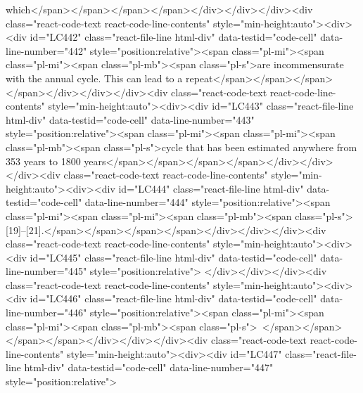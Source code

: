 {{{{{{which</span></span></span></span></div></div></div><div class="react-code-text react-code-line-contents" style="min-height:auto"><div><div id="LC442" class="react-file-line html-div" data-testid="code-cell" data-line-number="442" style="position:relative"><span class="pl-mi"><span class="pl-mi"><span class="pl-mb"><span class="pl-s">are incommensurate with the annual cycle. This can lead to a repeat</span></span></span></span></div></div></div><div class="react-code-text react-code-line-contents" style="min-height:auto"><div><div id="LC443" class="react-file-line html-div" data-testid="code-cell" data-line-number="443" style="position:relative"><span class="pl-mi"><span class="pl-mi"><span class="pl-mb"><span class="pl-s">cycle that has been estimated anywhere from 353 years to 1800 years</span></span></span></span></div></div></div><div class="react-code-text react-code-line-contents" style="min-height:auto"><div><div id="LC444" class="react-file-line html-div" data-testid="code-cell" data-line-number="444" style="position:relative"><span class="pl-mi"><span class="pl-mi"><span class="pl-mb"><span class="pl-s">{[}19{]}--{[}21{]}.</span></span></span></span></div></div></div><div class="react-code-text react-code-line-contents" style="min-height:auto"><div><div id="LC445" class="react-file-line html-div" data-testid="code-cell" data-line-number="445" style="position:relative">
</div></div></div><div class="react-code-text react-code-line-contents" style="min-height:auto"><div><div id="LC446" class="react-file-line html-div" data-testid="code-cell" data-line-number="446" style="position:relative"><span class="pl-mi"><span class="pl-mi"><span class="pl-mb"><span class="pl-s">~</span></span></span></span></div></div></div><div class="react-code-text react-code-line-contents" style="min-height:auto"><div><div id="LC447" class="react-file-line html-div" data-testid="code-cell" data-line-number="447" style="position:relative">
}}}}}}
